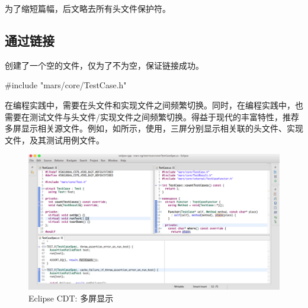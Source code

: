 \begin{content}
\begin{story}
\begin{content}
为了缩短篇幅，后文略去所有头文件保护符。

\end{content}

\end{story}

\subsection{通过链接}

创建了一个空的文件，仅为了不为空，保证链接成功。

\begin{leftbar}
 \begin{c++}[caption={\ttfamily{src/mars/core/TestCase.cc}}]
#include "mars/core/TestCase.h"
 \end{c++}
\end{leftbar}

\begin{story}
  \begin{center}
  \end{center}

\begin{content}

在\cpp{}编程实践中，需要在头文件和实现文件之间频繁切换。同时，在编程实践中，也需要在测试文件与头文件/实现文件之间频繁切换。得益于现代的丰富特性，推荐多屏显示相关源文件。例如，如所示，使用，三屏分别显示相关联的头文件、实现文件，及其测试用例文件。

\begin{figure}[H]
\centering
\includegraphics[width=1.0\textwidth]{figures/xunit/multi-editor-eclipse.png}
\caption{Eclipse CDT: 多屏显示}
 \label{fig:multi-editor-eclipse}
\end{figure}


\end{content}
\end{story}
\end{content}
